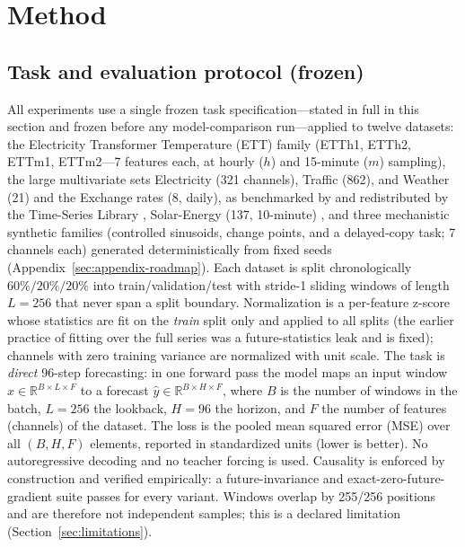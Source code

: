 \section{Method}
\label{sec:method}

\subsection{Task and evaluation protocol (frozen)}
\label{sec:task}
All experiments use a single frozen task specification---stated in full in
this section and frozen before any model-comparison run---applied to twelve
datasets: the Electricity Transformer Temperature (ETT) family
\citep{zhou2021informer} (ETTh1, ETTh2, ETTm1, ETTm2---7 features each, at
hourly ($h$) and 15-minute ($m$) sampling), the large multivariate sets Electricity (321
channels), Traffic (862), and Weather (21) and the Exchange rates (8,
daily), as benchmarked by \citet{wu2021autoformer} and redistributed by the
Time-Series Library \citep{wu2023timesnet}, Solar-Energy (137, 10-minute)
\citep{lai2018lstnet}, and three mechanistic synthetic families (controlled
sinusoids,
change points, and a delayed-copy task; 7 channels each) generated
deterministically from fixed seeds (Appendix~\ref{sec:appendix-roadmap}).
Each dataset is split chronologically $60\%/20\%/20\%$ into
train/validation/test with stride-1 sliding windows of length $L{=}256$ that
never span a split boundary. Normalization is a per-feature z-score whose
statistics are fit on the \emph{train} split only and applied to all splits
(the earlier practice of fitting over the full series was a future-statistics
leak and is fixed); channels with zero training variance are normalized with
unit scale. The task is \emph{direct} 96-step forecasting: in one forward
pass the model maps an input window $x \in \mathbb{R}^{B \times L \times F}$
to a forecast $\hat{y} \in \mathbb{R}^{B \times H \times F}$, where $B$ is the
number of windows in the batch, $L{=}256$ the lookback, $H{=}96$ the horizon,
and $F$ the number of features (channels) of the dataset. The loss is the
pooled mean squared error (MSE) over all $(B, H, F)$ elements, reported in
standardized units (lower is better).
No autoregressive decoding and no teacher forcing is used. Causality is
enforced by construction and verified empirically: a future-invariance and
exact-zero-future-gradient suite passes for every variant. Windows overlap
by 255/256 positions and are therefore not independent samples; this is a
declared limitation (Section~\ref{sec:limitations}).

